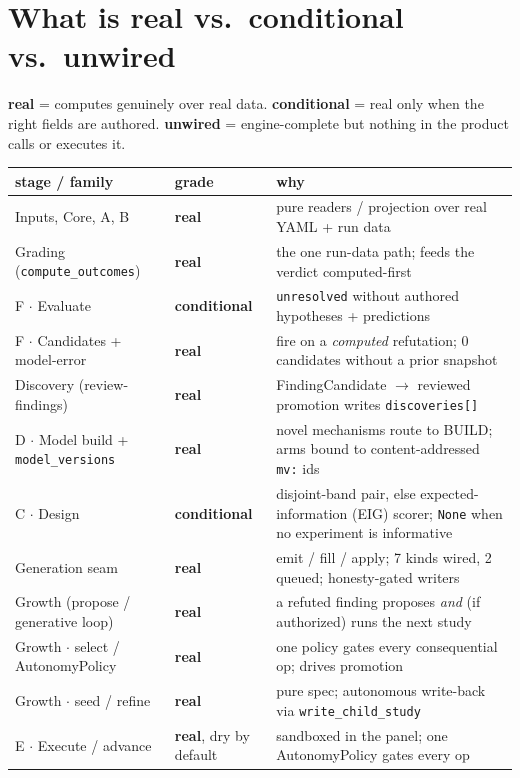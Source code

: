 \documentclass[11pt]{article}
\newcommand{\code}[1]{\texttt{\small #1}}
\newcommand{\real}{\textcolor{good}{\textbf{real}}}
\newcommand{\cond}{\textcolor{warn}{\textbf{conditional}}}
\newcommand{\unwired}{\textcolor{bad}{\textbf{unwired}}}
\begin{document}
\section{What is real vs.\ conditional vs.\ unwired}

\real{} = computes genuinely over real data. \cond{} = real only when the right fields are
authored. \unwired{} = engine-complete but nothing in the product calls or executes it.

\begin{center}\small
\begin{tabularx}{\textwidth}{@{}l l Y@{}}
\toprule
\textbf{stage / family} & \textbf{grade} & \textbf{why}\\
\midrule
Inputs, Core, A, B & \real & pure readers / projection over real YAML + run data\\
Grading (\code{compute\_outcomes}) & \real & the one run-data path; feeds the verdict computed-first\\
F $\cdot$ Evaluate & \cond & \code{unresolved} without authored hypotheses + predictions\\
F $\cdot$ Candidates + model-error & \real & fire on a \emph{computed} refutation; 0 candidates without a prior snapshot\\
Discovery (review-findings) & \real & FindingCandidate $\rightarrow$ reviewed promotion writes \code{discoveries[]}\\
D $\cdot$ Model build + \code{model\_versions} & \real & novel mechanisms route to BUILD; arms bound to content-addressed \code{mv:} ids\\
C $\cdot$ Design & \cond & disjoint-band pair, else expected-information (EIG) scorer; \code{None} when no experiment is informative\\
Generation seam & \real & emit / fill / apply; 7 kinds wired, 2 queued; honesty-gated writers\\
Growth (propose / generative loop) & \real & a refuted finding proposes \emph{and} (if authorized) runs the next study\\
Growth $\cdot$ select / AutonomyPolicy & \real & one policy gates every consequential op; drives promotion\\
Growth $\cdot$ seed / refine & \real & pure spec; autonomous write-back via \code{write\_child\_study}\\
E $\cdot$ Execute / advance & \real, dry by default & sandboxed in the panel; one AutonomyPolicy gates every op\\

\end{tabularx}
\end{center}
\end{document}
